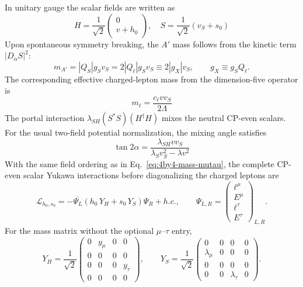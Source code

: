 \documentclass[onecolumn, aps, nofootinbib, prd, preprint, floats, floatfix, amsmath, amssymb, superscriptaddress, preprintnumbers]{revtex4-1}
\begin{document}
In unitary gauge the scalar fields are written as
\begin{equation}
    H = \frac{1}{\sqrt{2}} \begin{pmatrix} 0 \\ v + h_0 \end{pmatrix}, \quad S = \frac{1}{\sqrt{2}} (v_S + s_0)
\end{equation}
Upon spontaneous symmetry breaking, the \(A'\) mass follows from the kinetic term \(|D_\alpha S|^2\):
\begin{equation}
    m_{A'} = |Q_S| g_S v_S = 2 |Q_\ell| g_S v_S
    \equiv 2|g_X|v_S,\qquad g_X\equiv g_SQ_\ell .
\end{equation}
The corresponding effective charged-lepton mass from the dimension-five operator is
\begin{equation}
    m_\ell = \frac{c_\ell v v_S}{2\Lambda}
\end{equation}
The portal interaction \(\lambda_{SH}(S^* S)(H^\dagger H)\) mixes the neutral CP-even scalars. For the usual two-field potential normalization, the mixing angle satisfies
\begin{equation}
    \tan 2\alpha = \frac{\lambda_{SH} v v_S}{\lambda_S v_S^2 - \lambda v^2}
\end{equation}
With the same field ordering as in Eq.~\eqref{eq:4by4-mass-mutau}, the complete CP-even scalar Yukawa interactions before diagonalizing the charged leptons are
\begin{equation}
\mathcal{L}_{h_0,s_0}
=-\overline{\Psi_L}\left(h_0\,Y_H+s_0\,Y_S\right)\Psi_R+h.c.,
\qquad
\Psi_{L,R}=
\begin{pmatrix}
\ell^\mu\\ E^\mu\\ \ell^\tau\\ E^\tau
\end{pmatrix}_{L,R}.
\label{eq:full-scalar-yukawa-gauge}
\end{equation}
For the mass matrix without the optional $\mu$--$\tau$ entry,
\begin{equation}
Y_H=\frac{1}{\sqrt2}
\begin{pmatrix}
0&y_\mu&0&0\\
0&0&0&0\\
0&0&0&y_\tau\\
0&0&0&0
\end{pmatrix},
\qquad
Y_S=\frac{1}{\sqrt2}
\begin{pmatrix}
0&0&0&0\\
\lambda_\mu&0&0&0\\
0&0&0&0\\
0&0&\lambda_\tau&0
\end{pmatrix}.
\label{eq:scalar-yukawa-no-mutau}
\end{equation}
\end{document}

